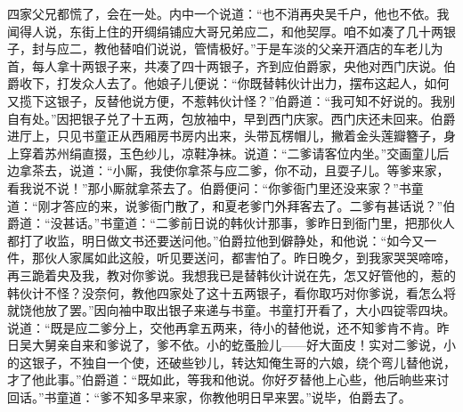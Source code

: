 四家父兄都慌了，会在一处。内中一个说道：“也不消再央吴千户，他也不依。我闻得人说，东街上住的开绸绢铺应大哥兄弟应二，和他契厚。咱不如凑了几十两银子，封与应二，教他替咱们说说，管情极好。”于是车淡的父亲开酒店的车老儿为首，每人拿十两银子来，共凑了四十两银子，齐到应伯爵家，央他对西门庆说。伯爵收下，打发众人去了。他娘子儿便说：“你既替韩伙计出力，摆布这起人，如何又揽下这银子，反替他说方便，不惹韩伙计怪？”伯爵道：“我可知不好说的。我别自有处。”因把银子兑了十五两，包放袖中，早到西门庆家。西门庆还未回来。伯爵进厅上，只见书童正从西厢房书房内出来，头带瓦楞帽儿，撇着金头莲瓣簪子，身上穿着苏州绢直掇，玉色纱儿，凉鞋净袜。说道：“二爹请客位内坐。”交画童儿后边拿茶去，说道：“小厮，我使你拿茶与应二爹，你不动，且耍子儿。等爹来家，看我说不说！”那小厮就拿茶去了。伯爵便问：“你爹衙门里还没来家？”书童道：“刚才答应的来，说爹衙门散了，和夏老爹门外拜客去了。二爹有甚话说？”伯爵道：“没甚话。”书童道：“二爹前日说的韩伙计那事，爹昨日到衙门里，把那伙人都打了收监，明日做文书还要送问他。”伯爵拉他到僻静处，和他说：“如今又一件，那伙人家属如此这般，听见要送问，都害怕了。昨日晚夕，到我家哭哭啼啼，再三跪着央及我，教对你爹说。我想我已是替韩伙计说在先，怎又好管他的，惹的韩伙计不怪？没奈何，教他四家处了这十五两银子，看你取巧对你爹说，看怎么将就饶他放了罢。”因向袖中取出银子来递与书童。书童打开看了，大小四锭零四块。说道：“既是应二爹分上，交他再拿五两来，待小的替他说，还不知爹肯不肯。昨日吴大舅亲自来和爹说了，爹不依。小的虼蚤脸儿——好大面皮！实对二爹说，小的这银子，不独自一个使，还破些钞儿，转达知俺生哥的六娘，绕个弯儿替他说，才了他此事。”伯爵道：“既如此，等我和他说。你好歹替他上心些，他后晌些来讨回话。”书童道：“爹不知多早来家，你教他明日早来罢。”说毕，伯爵去了。

